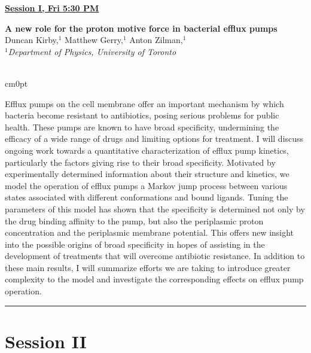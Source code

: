 \documentclass[titlepage,oneside,openany,10pt]{book}
\newenvironment{oralabswfig}[7] %
        {
	\FPeval{\cutw}{clip(16.7-#6)}
	\FPeval{\cutl}{round(#7/0.35,3)}
        \begin{flushright}
                \underline{\textbf{#4}}
        \end{flushright}
        \textbf{#1}\\%
        #2\\%
        \textit{#3}\\\\%
        \def\windowpagestuff{\flushright
                \texttt{[image: \#5]}}
        \opencutright
        \begin{cutout}{0}{\cutw cm}{0pt}{\RoundingUpFunction{\cutl}}
        \noindent
        }
        {
        \end{cutout}
        \noindent\rule{15cm}{0.5pt}%
        }
\begin{document}
\vspace{1cm}

\begin{oralabswfig}
	{A new role for the proton motive force in bacterial efflux pumps}
	{Duncan Kirby,$^{1}$ Matthew Gerry,$^{1}$ Anton Zilman,$^{1}$}
	{
	$^1$Department of Physics, University of Toronto
	}
	{Session I, Fri 5:30 PM}
	{abstract_figures/Gerry_Matthew_Oral.png}
	{7.0}
	{5.0}
	Efflux pumps on the cell membrane offer an important mechanism by which bacteria become resistant to antibiotics, posing serious problems for public health. These pumps are known to have broad specificity, undermining the efficacy of a wide range of drugs and limiting options for treatment. I will discuss ongoing work towards a quantitative characterization of efflux pump kinetics, particularly the factors giving rise to their broad specificity. Motivated by experimentally determined information about their structure and kinetics, we model the operation of efflux pumps a Markov jump process between various states associated with different conformations and bound ligands. Tuning the parameters of this model has shown that the specificity is determined not only by the drug binding affinity to the pump, but also the periplasmic proton concentration and the periplasmic membrane potential. This offers new insight into the possible origins of broad specificity in hopes of assisting in the development of treatments that will overcome antibiotic resistance. In addition to these main results, I will summarize efforts we are taking to introduce greater complexity to the model and investigate the corresponding effects on efflux pump operation.
	\label{GerryM}
\end{oralabswfig}

\newpage

\section*{Session II}
\label{sec:sessII}

\vspace{0.5cm}
\end{document}
